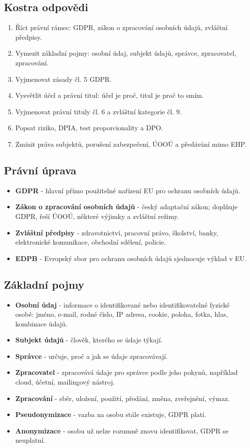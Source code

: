 \documentclass[11pt,a4paper]{article}
\begin{document}
\subsection*{Kostra odpovědi}
\begin{enumerate}
  \item Říct právní rámec: GDPR, zákon o zpracování osobních údajů, zvláštní předpisy.
  \item Vymezit základní pojmy: osobní údaj, subjekt údajů, správce, zpracovatel, zpracování.
  \item Vyjmenovat zásady čl. 5 GDPR.
  \item Vysvětlit účel a právní titul: účel je proč, titul je proč to smím.
  \item Vyjmenovat právní tituly čl. 6 a zvláštní kategorie čl. 9.
  \item Popsat riziko, DPIA, test proporcionality a DPO.
  \item Zmínit práva subjektů, porušení zabezpečení, ÚOOÚ a předávání mimo EHP.
\end{enumerate}

\subsection*{Právní úprava}
\begin{itemize}
  \item \textbf{GDPR} - hlavní přímo použitelné nařízení EU pro ochranu osobních údajů.
  \item \textbf{Zákon o zpracování osobních údajů} - český adaptační zákon; doplňuje GDPR, řeší ÚOOÚ, některé výjimky a zvláštní režimy.
  \item \textbf{Zvláštní předpisy} - zdravotnictví, pracovní právo, školství, banky, elektronické komunikace, obchodní sdělení, policie.
  \item \textbf{EDPB} - Evropský sbor pro ochranu osobních údajů sjednocuje výklad v EU.
\end{itemize}

\subsection*{Základní pojmy}
\begin{itemize}
  \item \textbf{Osobní údaj} - informace o identifikované nebo identifikovatelné fyzické osobě: jméno, e-mail, rodné číslo, IP adresa, cookie, poloha, fotka, hlas, kombinace údajů.
  \item \textbf{Subjekt údajů} - člověk, kterého se údaje týkají.
  \item \textbf{Správce} - určuje, proč a jak se údaje zpracovávají.
  \item \textbf{Zpracovatel} - zpracovává údaje pro správce podle jeho pokynů, například cloud, účetní, mailingový nástroj.
  \item \textbf{Zpracování} - sběr, uložení, použití, předání, změna, zveřejnění, výmaz.
  \item \textbf{Pseudonymizace} - vazba na osobu stále existuje, GDPR platí.
  \item \textbf{Anonymizace} - osobu už nelze rozumně znovu identifikovat, GDPR se neuplatní.
\end{itemize}
\end{document}
